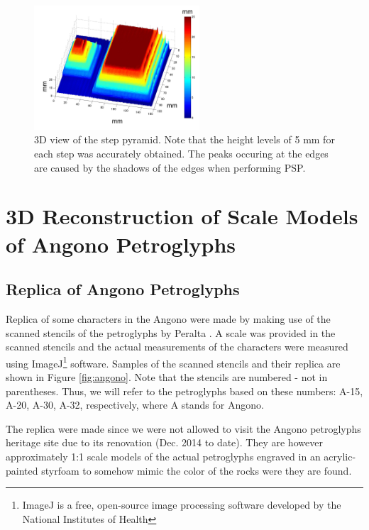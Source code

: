 \captionsetup[figure]{width=5.2in}
\begin{figure}[h!]
	\centering
	\includegraphics[width=0.55\textwidth]{figures/3Dpyramid.jpg}
	\caption[3D view of the step pyramid]{3D view of the step pyramid. Note that the height levels of 5 mm for each step was accurately obtained. The peaks occuring at the edges are caused by the shadows of the edges when performing PSP.}
	\label{fig:3Dpyramid}
\end{figure}

\section{3D Reconstruction of Scale Models of Angono Petroglyphs}

\subsection{Replica of Angono Petroglyphs}

Replica of some characters in the Angono were made by making use of the scanned stencils of the petroglyphs by Peralta \cite{Peralta1973}. A scale was provided in the scanned stencils and the actual measurements of the characters were measured using ImageJ\footnote{ImageJ is a free, open-source image processing software developed by the National Institutes of Health} software. Samples of the scanned stencils and their replica are shown in Figure \ref{fig:angono}. Note that the stencils are numbered - not in parentheses. Thus, we will refer to the petroglyphs based on these numbers: A-15, A-20, A-30, A-32, respectively, where A stands for Angono.

The replica were made since we were not allowed to visit the Angono petroglyphs heritage site due to its renovation (Dec. 2014 to date).  They are however approximately 1:1 scale models of the actual petroglyphs engraved in an acrylic-painted styrfoam to somehow mimic the color of the rocks were they are found.

